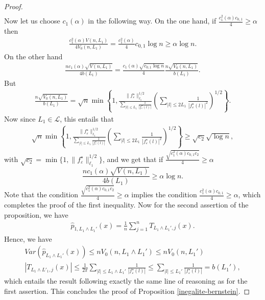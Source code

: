 \documentclass[11pt,a4paper,openany]{article}
\begin{document}
\begin{proof}
\begin{eqnarray*}
\end{eqnarray*}
Now let us choose $c_1(\alpha)$ in the following way. On the one hand, if $\frac{c_1^2(\alpha)c_{0,1}}{4}\geq  \alpha$ then 
\begin{eqnarray*}
\frac{ c_1^2(\alpha) V(n,L_1) }{4V_0(n,L_1)} = \frac{c_1^2(\alpha)}{4} c_{0,1} \log n  \geq \alpha \log n.
\end{eqnarray*}
On the other hand 
\begin{eqnarray*}
\frac{nc_1(\alpha) \sqrt{V(n,L_1)}}{4 b(L_1)} = \frac{c_1(\alpha) \sqrt{c_{0,1}\log n }}{4}  \frac{n \sqrt{V_0(n,L_1)}}{b(L_1)}.
\end{eqnarray*}
But 
\begin{eqnarray*}
 \frac{n \sqrt{V_0(n,L_1)}}{b(L_1)} = \sqrt{n} \min \left \{1,  \frac{  \| f^\star_{\varepsilon} \|_{\ell_1}^{1/2}} { \sum_{ | l | \leq L_1}  \frac{1}{ |f^\star_{\varepsilon}(l)| } } \left( \sum_{|l | \leq 2L_1}   \frac{1}{ |f^\star_{\varepsilon}(l)|^2}    \right)^{1/2} \right \}.
\end{eqnarray*}
Now since $L_1 \in \mathcal{L}$, this entails that 
\begin{eqnarray}
\sqrt{n} \min \left \{1,  \frac{  \| f^\star_{\varepsilon} \|_{\ell_1}^{1/2}} { \sum_{ | l | \leq L_1}  \frac{1}{ |f^\star_{\varepsilon}(l)| } } \left( \sum_{|l | \leq 2L_1 }   \frac{1}{ |f^\star_{\varepsilon}(l)|^2}    \right)^{1/2} \right\} \geq \sqrt{c_2} \sqrt{\log n },
\end{eqnarray}
with $\sqrt{c_2}= \min\{1, \| f^\star_{\varepsilon} \|_{\ell_1}^{1/2}\}$, and we get that if $ \frac{\sqrt{c_1^2(\alpha) c_{0,1} c_2}}{4} \geq \alpha$
$$
\frac{nc_1(\alpha) \sqrt{V(n,L_1)}}{4 b(L_1)}\geq \alpha \log n. 
$$
Note that the condition $ \frac{\sqrt{c_1^2(\alpha) c_{0,1} c_2}}{4}  \geq \alpha$ implies the condition $\frac{c_1^2(\alpha)c_{0,1}}{4}\geq  \alpha$, which completes the proof of the first inequality. Now for the second assertion of the proposition, we have 
\begin{eqnarray}
\widehat p_{1, L_1 \wedge L_1'}(x)= \frac 1 n \sum_{j=1}^n T_{L _1\wedge L_1', j} (x). 
\end{eqnarray}
Hence, we have 
\begin{eqnarray*}
Var(\widehat p_{L_1 \wedge L_1'}(x)) \leq n V_0(n, L_1 \wedge L_1') \leq n V_0(n, L_1') \\
 |T_{L_1 \wedge L'_1, j} (x) | \leq  \frac{1}{2\pi}  \sum_{| l| \leq L_1\wedge L_1' } \frac{1}{|f^\star_{\varepsilon}(l)|}  \leq   \sum_{| l| \leq L_1' } \frac{1}{|f^\star_{\varepsilon}(l)|} =  b(L_1'),
\end{eqnarray*}
which entails the result following exactly the same line of reasoning as for the first assertion. This concludes the proof of Proposition \ref{inegalite-bernstein}.
\end{proof}
\end{document}
